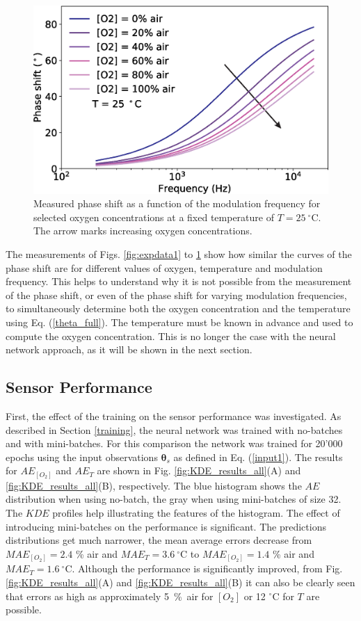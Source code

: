 \documentclass[final,5p,times,twocolumn]{elsarticle}
\begin{document}
\begin{figure}[t!]
\centering
\includegraphics[width=8.2 cm]{phase_f_O2.eps}
\caption{Measured phase shift as a function of the modulation frequency for selected oxygen concentrations at a fixed temperature of $T=25 \ ^{\circ}$C. The arrow marks increasing oxygen concentrations.}
\label{fig:expdata3}
\end{figure}

The measurements of Figs. \ref{fig:expdata1} to \ref{fig:expdata3} show how similar the curves of the phase shift are for different values of oxygen, temperature and modulation frequency. This helps to understand why it is not possible from the measurement of the phase shift, or even of the phase shift for varying modulation frequencies, to simultaneously determine both the oxygen concentration and the temperature using Eq. (\ref{theta_full}). The temperature must be known in advance and used to compute the oxygen concentration. This is no longer the case with the neural network approach, as it will be shown in the next section. 


\subsection{Sensor Performance}

First, the effect of the training on the sensor performance was investigated. As described in Section \ref{training}, the neural network was trained with no-batches and with mini-batches. For this comparison the network was trained for 20'000 epochs using the input observations ${\pmb \theta}_s$ as defined in Eq. (\ref{input1}). The results for $AE_{[O_2]}$ and $AE_T$ are shown in Fig. \ref{fig:KDE_results_all}(A) and \ref{fig:KDE_results_all}(B), respectively. The blue histogram shows the $AE$ distribution when using no-batch, the gray when using mini-batches of size 32. The $KDE$ profiles help illustrating the features of the histogram. The effect of introducing mini-batches on the performance is significant. The predictions distributions get much narrower, the mean average errors decrease from $MAE_{[O_2]}=2.4$ \% air and $MAE_{T}=3.6 \ ^\circ$C to $MAE_{[O_2]}=1.4$ \% air and $MAE_{T}=1.6 \ ^\circ$C. Although the performance is significantly improved, from Fig. \ref{fig:KDE_results_all}(A) and \ref{fig:KDE_results_all}(B) it can also be clearly seen that errors as high as approximately 5~\%~air for $[O_2]$ or 12 $^\circ$C for $T$ are possible.
\end{document}
